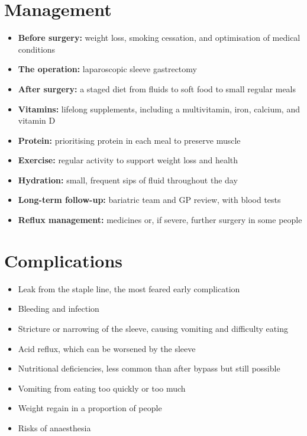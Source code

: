 \section*{Management}
\begin{itemize}
    \item \textbf{Before surgery:} weight loss, smoking cessation, and optimisation of medical conditions
    \item \textbf{The operation:} laparoscopic sleeve gastrectomy
    \item \textbf{After surgery:} a staged diet from fluids to soft food to small regular meals
    \item \textbf{Vitamins:} lifelong supplements, including a multivitamin, iron, calcium, and vitamin D
    \item \textbf{Protein:} prioritising protein in each meal to preserve muscle
    \item \textbf{Exercise:} regular activity to support weight loss and health
    \item \textbf{Hydration:} small, frequent sips of fluid throughout the day
    \item \textbf{Long-term follow-up:} bariatric team and GP review, with blood tests
    \item \textbf{Reflux management:} medicines or, if severe, further surgery in some people
\end{itemize}

\section*{Complications}
\begin{itemize}
    \item Leak from the staple line, the most feared early complication
    \item Bleeding and infection
    \item Stricture or narrowing of the sleeve, causing vomiting and difficulty eating
    \item Acid reflux, which can be worsened by the sleeve
    \item Nutritional deficiencies, less common than after bypass but still possible
    \item Vomiting from eating too quickly or too much
    \item Weight regain in a proportion of people
    \item Risks of anaesthesia
\end{itemize}

